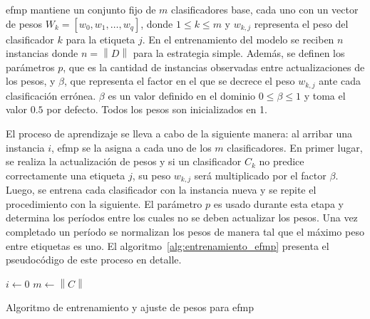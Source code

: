 \acrshort{efmp} mantiene un conjunto fijo de $m$ clasificadores base, cada uno
con un vector de pesos $W_{k} = [w_{0}, w_{1}, \dots, w_{q}]$, donde $1 \leq k
	\leq m$ y $w_{k,j}$ representa el peso del clasificador $k$ para la etiqueta
$j$. En el entrenamiento del modelo se reciben $n$ instancias donde
$n=\left\|D\right\|$ para la estrategia simple. Además, se definen los parámetros
$p$, que es la cantidad de instancias observadas entre actualizaciones de los
pesos, y $\beta$, que representa el factor en el que se decrece el peso
$w_{k,j}$ ante cada clasificación errónea. $\beta$ es un valor definido en el
dominio $0 \leq \beta \leq 1$ y toma el valor $0.5$ por defecto. Todos los pesos
son inicializados en 1.

El proceso de aprendizaje se lleva a cabo de la siguiente manera: al arribar una
instancia $i$, \acrshort{efmp} se la asigna a cada uno de los $m$
clasificadores. En primer lugar, se realiza la actualización de pesos y si un
clasificador $C_{k}$ no predice correctamente una etiqueta $j$, su peso
$w_{k,j}$ será multiplicado por el factor $\beta$. Luego, se entrena cada
clasificador con la instancia nueva y se repite el procedimiento con la
siguiente. El parámetro $p$ es usado durante esta etapa y determina los períodos
entre los cuales no se deben actualizar los pesos. Una vez completado un período
se normalizan los pesos de manera tal que el máximo peso entre etiquetas es uno.
El algoritmo~\ref{alg:entrenamiento_efmp} presenta el pseudocódigo de este
proceso en detalle.

\begin{center}
	\begin{algorithm}[H]
		\label{alg:entrenamiento_efmp}
		\SetAlgoLined
		\DontPrintSemicolon
		$i \gets 0$ \;
		$m \gets \left\|C\right\|$ \;
		\caption{Algoritmo de entrenamiento y ajuste de pesos para \acrfull{efmp}}
	\end{algorithm}
\end{center}

